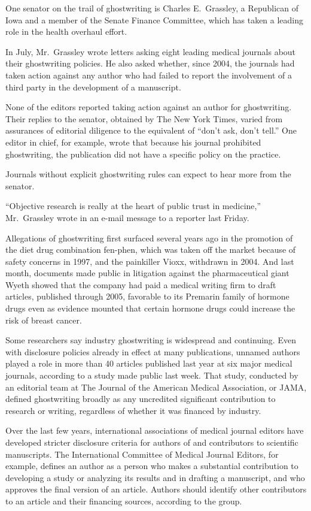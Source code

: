 ﻿\documentclass[12pt]{article}
\begin{document}
One senator on the trail of ghostwriting is Charles E.~Grassley, a Republican of Iowa and a member
of the Senate Finance Committee, which has taken a leading role in the health overhaul effort.

In July, Mr.~Grassley wrote letters asking eight leading medical journals about their ghostwriting
policies. He also asked whether, since 2004, the journals had taken action against any author who
had failed to report the involvement of a third party in the development of a manuscript.

None of the editors reported taking action against an author for ghostwriting. Their replies to the
senator, obtained by The New York Times, varied from assurances of editorial
diligence\cite{diligence} to the equivalent of ``don't ask, don't tell.'' One editor in chief, for
example, wrote that because his journal prohibited ghostwriting, the publication did not have a
specific policy on the practice.

Journals without explicit ghostwriting rules can expect to hear more from the senator.

``Objective research is really at the heart of public trust in medicine,'' Mr.~Grassley wrote in an
e-mail message to a reporter last Friday.

Allegations of ghostwriting first surfaced several years ago in the promotion of the diet drug
combination fen-phen, which was taken off the market because of safety concerns in 1997, and the
painkiller Vioxx, withdrawn in 2004. And last month, documents made public in litigation against the
pharmaceutical giant Wyeth showed that the company had paid a medical writing firm to draft
articles, published through 2005, favorable to its Premarin family of hormone drugs even as evidence
mounted that certain hormone drugs could increase the risk of breast cancer.

Some researchers say industry ghostwriting is widespread and continuing. Even with disclosure
policies already in effect at many publications, unnamed authors played a role in more than 40
articles published last year at six major medical journals, according to a study made public last
week. That study, conducted by an editorial team at The Journal of the American Medical Association,
or JAMA, defined ghostwriting broadly as any uncredited significant contribution to research or
writing, regardless of whether it was financed by industry.

Over the last few years, international associations of medical journal editors have developed
stricter disclosure criteria for authors of and contributors to scientific manuscripts. The
International Committee of Medical Journal Editors, for example, defines an author as a person who
makes a substantial contribution to developing a study or analyzing its results and in drafting a
manuscript, and who approves the final version of an article. Authors should identify other
contributors to an article and their financing sources, according to the group.
\end{document}
